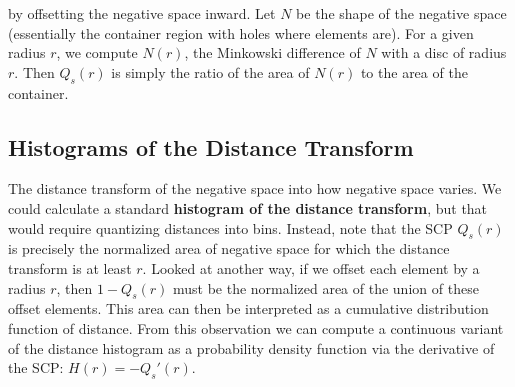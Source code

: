  by offsetting the negative
space inward.  Let $N$ be the shape of the negative space (essentially
the container region with holes where elements are).  For a given radius
$r$, we compute $N(r)$, the Minkowski difference of $N$ with a disc of
radius $r$.  Then $Q_s(r)$ is simply the ratio of the area of $N(r)$ to
the area of the container.

\subsection{Histograms of the Distance Transform}
The distance transform of the negative space  into
how negative space varies.  We could calculate a standard \textbf{histogram of the
distance transform}, but that would require quantizing distances into bins.
Instead, note that the SCP $Q_s(r)$ is precisely the normalized area of 
negative space for which the distance transform is at least $r$. 
 Looked at another way, if we offset each element by a
   radius $r$, then $1-Q_s(r)$ must be the normalized 
     area of the union of these offset elements.
This area can then be interpreted as 
a cumulative distribution function of distance.  From this observation
we can compute a continuous variant of the distance histogram as a 
probability density function via the derivative of the SCP: $H(r)=-Q_s'(r)$.


